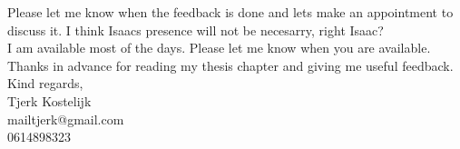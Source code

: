 Please let me know when the feedback is done and lets make an appointment to discuss it. I think Isaacs presence will not be necesarry, right Isaac?\\
I am available most of the days. Please let me know when you are available.\\

Thanks in advance for reading my thesis chapter and giving me useful feedback.\\

Kind regards,\\
Tjerk Kostelijk\\
mailtjerk@gmail.com\\
0614898323
